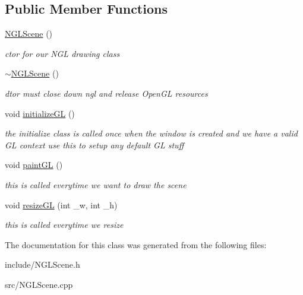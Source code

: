 \subsection*{Public Member Functions}
\begin{DoxyCompactItemize}
\item 
\hypertarget{class_n_g_l_scene_a1bed6be9823459aeb1e58af2464ba633}{\hyperlink{class_n_g_l_scene_a1bed6be9823459aeb1e58af2464ba633}{N\-G\-L\-Scene} ()}\label{class_n_g_l_scene_a1bed6be9823459aeb1e58af2464ba633}

\begin{DoxyCompactList}\small\item\em ctor for our N\-G\-L drawing class \end{DoxyCompactList}\item 
\hypertarget{class_n_g_l_scene_abda05d130945833bfbb6bad8d619f7f5}{\hyperlink{class_n_g_l_scene_abda05d130945833bfbb6bad8d619f7f5}{$\sim$\-N\-G\-L\-Scene} ()}\label{class_n_g_l_scene_abda05d130945833bfbb6bad8d619f7f5}

\begin{DoxyCompactList}\small\item\em dtor must close down ngl and release Open\-G\-L resources \end{DoxyCompactList}\item 
\hypertarget{class_n_g_l_scene_aab2b866db534d286a56cc2240ed98790}{void \hyperlink{class_n_g_l_scene_aab2b866db534d286a56cc2240ed98790}{initialize\-G\-L} ()}\label{class_n_g_l_scene_aab2b866db534d286a56cc2240ed98790}

\begin{DoxyCompactList}\small\item\em the initialize class is called once when the window is created and we have a valid G\-L context use this to setup any default G\-L stuff \end{DoxyCompactList}\item 
\hypertarget{class_n_g_l_scene_a37bec65bfba7b7a717d803d369221e2d}{void \hyperlink{class_n_g_l_scene_a37bec65bfba7b7a717d803d369221e2d}{paint\-G\-L} ()}\label{class_n_g_l_scene_a37bec65bfba7b7a717d803d369221e2d}

\begin{DoxyCompactList}\small\item\em this is called everytime we want to draw the scene \end{DoxyCompactList}\item 
\hypertarget{class_n_g_l_scene_a7505fac688fe82b4f99e601043eb7764}{void \hyperlink{class_n_g_l_scene_a7505fac688fe82b4f99e601043eb7764}{resize\-G\-L} (int \-\_\-w, int \-\_\-h)}\label{class_n_g_l_scene_a7505fac688fe82b4f99e601043eb7764}

\begin{DoxyCompactList}\small\item\em this is called everytime we resize \end{DoxyCompactList}\end{DoxyCompactItemize}


The documentation for this class was generated from the following files\-:\begin{DoxyCompactItemize}
\item 
include/N\-G\-L\-Scene.\-h\item 
src/N\-G\-L\-Scene.\-cpp\end{DoxyCompactItemize}
